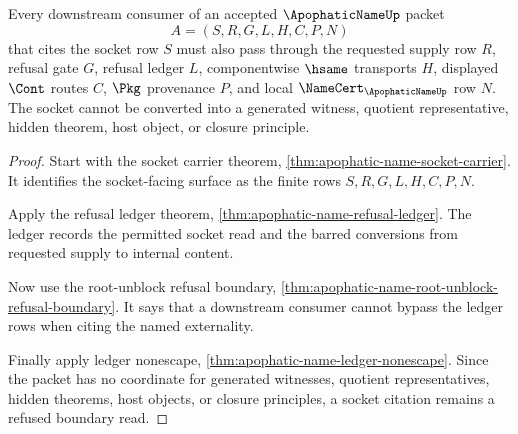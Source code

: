 \begin{theorem}
\label{thm:apophatic-name-socket-refusal}
Every downstream consumer of an accepted $\ApophaticNameUp$ packet
$$
A=(S,R,G,L,H,C,P,N)
$$
that cites the socket row $S$ must also pass through the requested supply row $R$, refusal gate $G$, refusal ledger $L$, componentwise $\hsame$ transports $H$, displayed $\Cont$ routes $C$, $\Pkg$ provenance $P$, and local $\NameCert_{\ApophaticNameUp}$ row $N$. The socket cannot be converted into a generated witness, quotient representative, hidden theorem, host object, or closure principle.
\end{theorem}
\begin{proof}
Start with the socket carrier theorem, \autoref{thm:apophatic-name-socket-carrier}. It identifies the socket-facing surface as the finite rows $S,R,G,L,H,C,P,N$.

Apply the refusal ledger theorem, \autoref{thm:apophatic-name-refusal-ledger}. The ledger records the permitted socket read and the barred conversions from requested supply to internal content.

Now use the root-unblock refusal boundary, \autoref{thm:apophatic-name-root-unblock-refusal-boundary}. It says that a downstream consumer cannot bypass the ledger rows when citing the named externality.

Finally apply ledger nonescape, \autoref{thm:apophatic-name-ledger-nonescape}. Since the packet has no coordinate for generated witnesses, quotient representatives, hidden theorems, host objects, or closure principles, a socket citation remains a refused boundary read.
\end{proof}

